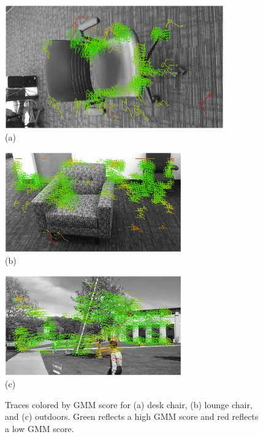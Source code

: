 \begin{figure}[tb]
	\hspace{-0.6cm}
	\begin{minipage}[b]{0.5\linewidth}
		\centering
		\includegraphics[height=2.1in,angle=-90]{figs/desk-1.eps}\\ (a)
	\end{minipage}
	\hspace{0cm}
	\begin{minipage}[b]{0.5\linewidth}
		\centering
		\begin{minipage}[b]{\linewidth}
			\centering
			\includegraphics[width=3in]{figs/lounge-1.eps} \\ (b)
		\end{minipage}
		\vspace{0.1cm}
		\begin{minipage}[b]{\linewidth}
			\centering
			\includegraphics[width=3in]{figs/outdoor3-90.eps} \\ (c)
		\end{minipage}

	\end{minipage}
	\caption{Traces colored by GMM score for (a) desk chair, (b) lounge chair, and (c) outdoors.  Green reflects a high GMM score and red reflects a low GMM score.}
	\label{fig:colored-traces}
\end{figure}



